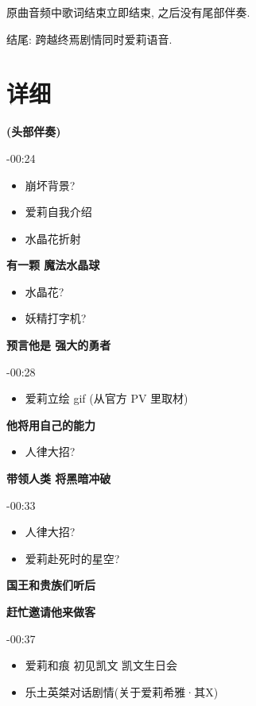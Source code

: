 \documentclass[a4paper]{article}
\begin{document}
原曲音频中歌词结束立即结束, 之后没有尾部伴奏.

结尾: 跨越终焉剧情同时爱莉语音.

\section{详细}

\textbf{(头部伴奏)}

-00:24

\begin{itemize}
    \item 崩坏背景?
    \item 爱莉自我介绍
    \item 水晶花折射
\end{itemize}

\textbf{有一颗 魔法水晶球}

\begin{itemize}
    \item 水晶花?
    \item 妖精打字机?
\end{itemize}

\textbf{预言他是 强大的勇者}

-00:28

\begin{itemize}
    \item 爱莉立绘 gif (从官方 PV 里取材)
\end{itemize}

\textbf{他将用自己的能力}

\begin{itemize}
    \item 人律大招?
\end{itemize}

\textbf{带领人类 将黑暗冲破}

-00:33

\begin{itemize}
    \item 人律大招?
    \item 爱莉赴死时的星空?
\end{itemize}

\textbf{国王和贵族们听后}

\textbf{赶忙邀请他来做客}

-00:37

\begin{itemize}
    \item 爱莉和痕 初见凯文 凯文生日会
    \item 乐土英桀对话剧情(关于爱莉希雅·其X)
\end{itemize}
\end{document}
